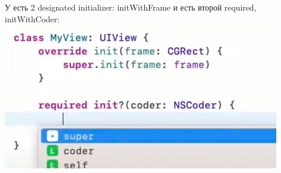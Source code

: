 \documentclass{article}
\begin{document}
    \newline
    У  есть 2 designated initializer: initWithFrame и есть второй required, initWithCoder: 
    \newline
    \includegraphics[scale = 0.5]{pic/Снимок экрана 2023-07-31 в 20.29.42.png}
\end{document}
